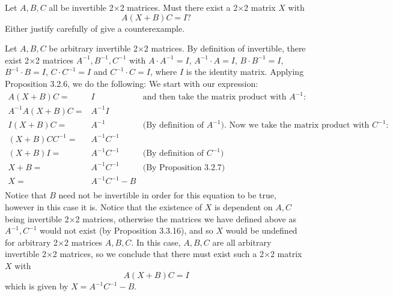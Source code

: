 \documentclass[12pt]{article}
\newenvironment{problem}[2][Problem]
{
	\begin{trivlist} 
		\item[\hskip \labelsep {\bfseries #1 #2:}]
	}
{
	\end{trivlist}
	}
\newenvironment{solution}[1][Solution]
{
	\begin{trivlist} 
		\item[\hskip \labelsep {\itshape #1:}]
	}
	{
	\end{trivlist}
}
\begin{document}
\newpage
\begin{problem}{6}
Let $A,B,C$ all be invertible 2$\times$2 matrices. Must there exist a 2$\times$2 matrix $X$ with
\[
A(X+B)C=I\text{?}
\]
Either justify carefully of give a counterexample.
%
%
\noindent
\newline
\newline

\begin{solution}
Let $A,B,C$ be arbitrary invertible 2$\times$2 matrices. By definition of invertible, there exist 2$\times$2 matrices  $A^{-1} , B^{-1} , C^{-1}$ with $A\cdot A^{-1} =I$, $A^{-1}\cdot A=I$, $B\cdot B^{-1} =I$,$B^{-1}\cdot B=I$, $C\cdot C^{-1} =I$ and $C^{-1}\cdot C=I$, where $I$ is the identity matrix. 
Applying Proposition 3.2.6, we do the following: We start with our expression:
\begin{align*}
 A(X+B)C =& I & \text{and then take the matrix product with $A^{-1}$:}\\
 A^{-1}A(X+B)C= &A^{-1} I & \text{}\\
 I(X+B)C=&A^{-1} & \text{(By definition of $A^{-1}$). Now we take the matrix product with $C^{-1}$:}\\
 (X+B)CC^{-1}=&A^{-1} C^{-1} &\text{}\\
 (X+B)I = &A^{-1} C^{-1} &\text{(By definition of $C^{-1}$)}\\
 X+B = &A^{-1} C^{-1} &\text{(By Proposition 3.2.7)}\\
 X = &A^{-1} C^{-1} -B &\text{}\\
\end{align*}
Notice that $B$ need not be invertible in order for this equation to be true, however in this case it is. Notice that the existence of $X$ is dependent on $A,C$ being invertible 2$\times$2 matrices, otherwise the matrices we have defined above as $A^{-1} , C^{-1}$ would not exist (by Proposition 3.3.16), and so $X$ would be undefined for arbitrary 2$\times$2 matrices $A,B,C$. In this case, $A,B,C$ are all arbitrary invertible 2$\times$2 matrices, so we conclude that there must exist such a 2$\times$2 matrix $X$ with
\[
A(X+B)C=I
\]
which is given by $X = A^{-1} C^{-1} -B$. 
\end{solution}
\end{problem}
\end{document}
